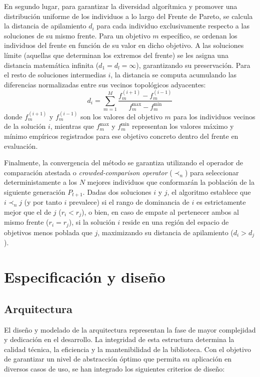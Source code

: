 \documentclass[12pt,a4paper,twoside,openright]{book}
\begin{document}
        En segundo lugar, para garantizar la diversidad algorítmica y promover una distribución uniforme de los individuos a lo largo del Frente de Pareto, se calcula la distancia de apilamiento $d_i$ para cada individuo exclusivamente respecto a las soluciones de su mismo frente. Para un objetivo $m$ específico, se ordenan los individuos del frente en función de su valor en dicho objetivo. A las soluciones límite (aquellas que determinan los extremos del frente) se les asigna una distancia matemática infinita ($d_1 = d_{l} = \infty$), garantizando su preservación. Para el resto de soluciones intermedias $i$, la distancia se computa acumulando las diferencias normalizadas entre sus vecinos topológicos adyacentes:
        \begin{equation}
            d_i = \sum_{m=1}^{M} \frac{f_m^{(i+1)} - f_m^{(i-1)}}{f_m^{\max} - f_m^{\min}}
        \end{equation}
        donde $f_m^{(i+1)}$ y $f_m^{(i-1)}$ son los valores del objetivo $m$ para los individuos vecinos de la solución $i$, mientras que $f_m^{\max}$ y $f_m^{\min}$ representan los valores máximo y mínimo empíricos registrados para ese objetivo concreto dentro del frente en evaluación.
        
        Finalmente, la convergencia del método se garantiza utilizando el operador de comparación atestada o \textit{crowded-comparison operator} ($\prec_n$) para seleccionar deterministamente a los $N$ mejores individuos que conformarán la población de la siguiente generación $P_{t+1}$. Dadas dos soluciones $i$ y $j$, el algoritmo establece que $i \prec_n j$ (y por tanto $i$ prevalece) si el rango de dominancia de $i$ es estrictamente mejor que el de $j$ ($r_i < r_j$), o bien, en caso de empate al pertenecer ambos al mismo frente ($r_i = r_j$), si la solución $i$ reside en una región del espacio de objetivos menos poblada que $j$, maximizando su distancia de apilamiento ($d_i > d_j$).

\chapter{Especificación y diseño}

\section{Arquitectura}
    El diseño y modelado de la arquitectura representan la fase de mayor complejidad y dedicación en el desarrollo. La integridad de esta estructura determina la calidad técnica, la eficiencia y la mantenibilidad de la biblioteca. Con el objetivo de garantizar un nivel de abstracción óptimo que permita su aplicación en diversos casos de uso, se han integrado los siguientes criterios de diseño:
    
\end{document}
